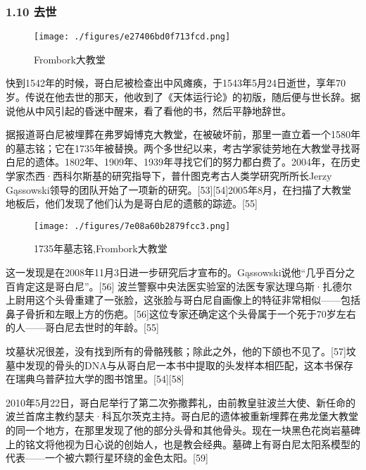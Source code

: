 \subsubsection{1.10 去世}
\begin{figure}[ht]
\centering
\texttt{[image: ./figures/e27406bd0f713fcd.png]}
\caption{Frombork大教堂} \label{fig_GBN_18}
\end{figure}
快到1542年的时候，哥白尼被检查出中风瘫痪，于1543年5月24日逝世，享年70岁。传说在他去世的那天，他收到了《天体运行论》的初版，随后便与世长辞。据说他从中风引起的昏迷中醒来，看了看他的书，然后平静地辞世。

据报道哥白尼被埋葬在弗罗姆博克大教堂，在被破坏前，那里一直立着一个1580年的墓志铭；它在1735年被替换。两个多世纪以来，考古学家徒劳地在大教堂寻找哥白尼的遗体。1802年、1909年、1939年寻找它们的努力都白费了。2004年，在历史学家杰西·西科尔斯基的研究指导下，普什图克考古人类学研究所所长Jerzy Gąssowski领导的团队开始了一项新的研究。[53][54]2005年8月，在扫描了大教堂地板后，他们发现了他们认为是哥白尼的遗骸的踪迹。[55]
\begin{figure}[ht]
\centering
\texttt{[image: ./figures/7e08a60b2879fcc3.png]}
\caption{1735年墓志铭,Frombork大教堂} \label{fig_GBN_19}
\end{figure}
这一发现是在2008年11月3日进一步研究后才宣布的。Gąssowski说他“几乎百分之百肯定这是哥白尼”。[56] 波兰警察中央法医实验室的法医专家达理乌斯·扎德尔上尉用这个头骨重建了一张脸，这张脸与哥白尼自画像上的特征非常相似——包括鼻子骨折和左眼上方的伤疤。[56]这位专家还确定这个头骨属于一个死于70岁左右的人——哥白尼去世时的年龄。[55]

坟墓状况很差，没有找到所有的骨骼残骸；除此之外，他的下颌也不见了。[57]坟墓中发现的骨头的DNA与从哥白尼一本书中提取的头发样本相匹配，这本书保存在瑞典乌普萨拉大学的图书馆里。[54][58]

2010年5月22日，哥白尼举行了第二次弥撒葬礼，由前教皇驻波兰大使、新任命的波兰首席主教约瑟夫·科瓦尔茨克主持。哥白尼的遗体被重新埋葬在弗龙堡大教堂的同一个地方，在那里发现了他的部分头骨和其他骨头。现在一块黑色花岗岩墓碑上的铭文将他视为日心说的创始人，也是教会经典。墓碑上有哥白尼太阳系模型的代表——一个被六颗行星环绕的金色太阳。[59]